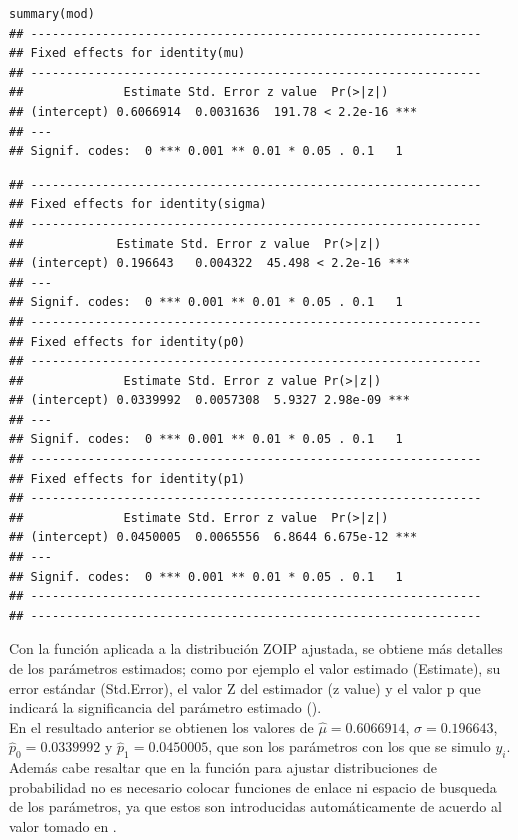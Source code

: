 \begin{verbatim}
summary(mod)
## ---------------------------------------------------------------
## Fixed effects for identity(mu)
## ---------------------------------------------------------------
##              Estimate Std. Error z value  Pr(>|z|)    
## (intercept) 0.6066914  0.0031636  191.78 < 2.2e-16 ***
## ---
## Signif. codes:  0 *** 0.001 ** 0.01 * 0.05 . 0.1   1
\end{verbatim}
\begin{verbatim}
## ---------------------------------------------------------------
## Fixed effects for identity(sigma)
## ---------------------------------------------------------------
##             Estimate Std. Error z value  Pr(>|z|)    
## (intercept) 0.196643   0.004322  45.498 < 2.2e-16 ***
## ---
## Signif. codes:  0 *** 0.001 ** 0.01 * 0.05 . 0.1   1
## ---------------------------------------------------------------
## Fixed effects for identity(p0)
## ---------------------------------------------------------------
##              Estimate Std. Error z value Pr(>|z|)    
## (intercept) 0.0339992  0.0057308  5.9327 2.98e-09 ***
## ---
## Signif. codes:  0 *** 0.001 ** 0.01 * 0.05 . 0.1   1
## ---------------------------------------------------------------
## Fixed effects for identity(p1)
## ---------------------------------------------------------------
##              Estimate Std. Error z value  Pr(>|z|)    
## (intercept) 0.0450005  0.0065556  6.8644 6.675e-12 ***
## ---
## Signif. codes:  0 *** 0.001 ** 0.01 * 0.05 . 0.1   1
## ---------------------------------------------------------------
## ---------------------------------------------------------------
\end{verbatim}
Con la funci\'{o}n  aplicada a la distribuci\'{o}n ZOIP ajustada, se obtiene m\'{a}s detalles de los par\'{a}metros estimados; como por ejemplo el valor estimado (Estimate), su error est\'{a}ndar (Std.Error), el valor Z del estimador (z value) y el valor p que indicar\'{a} la significancia del par\'{a}metro estimado ().\\

En el resultado anterior se obtienen los valores de $\hat{\mu}=0.6066914$, $\hat{\sigma}=0.196643$, $\hat{p}_0=0.0339992$ y $\hat{p}_1=0.0450005$, que son los par\'{a}metros con los que se simulo $y_i$. Adem\'{a}s cabe resaltar que en la funci\'{o}n  para ajustar distribuciones de probabilidad no es necesario colocar funciones de enlace ni espacio de busqueda de los par\'{a}metros, ya que estos son introducidas autom\'{a}ticamente de acuerdo al valor tomado en .\\

